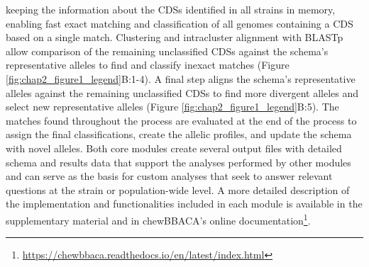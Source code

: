 keeping the information about the \acp{CDS} identified in all strains in memory, enabling fast exact matching and classification of all genomes containing a \ac{CDS} based on a single match. Clustering and intracluster alignment with \ac{BLASTp} allow comparison of the remaining unclassified \acp{CDS} against the schema's representative alleles to find and classify inexact matches (Figure \ref{fig:chap2_figure1_legend}B:1-4). A final step aligns the schema's representative alleles against the remaining unclassified \acp{CDS} to find more divergent alleles and select new representative alleles (Figure \ref{fig:chap2_figure1_legend}B:5). The matches found throughout the process are evaluated at the end of the process to assign the final classifications, create the allelic profiles, and update the schema with novel alleles. Both core modules create several output files with detailed schema and results data that support the analyses performed by other modules and can serve as the basis for custom analyses that seek to answer relevant questions at the strain or population-wide level.
A more detailed description of the implementation and functionalities included in each module is available in the supplementary material and in chewBBACA’s online documentation\footnote{\url{https://chewbbaca.readthedocs.io/en/latest/index.html}}.

